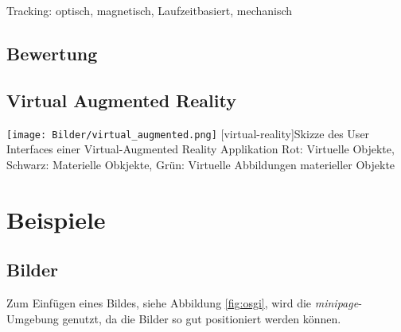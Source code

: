 \documentclass[12pt,a4paper,bibliography=totocnumbered,listof=totocnumbered]{scrartcl}
\begin{document}
Tracking: optisch, magnetisch, Laufzeitbasiert, mechanisch  
\subsection{Bewertung} 
\subsection{Virtual Augmented Reality}
\begin{minipage}{\linewidth}
\vspace{1em}
	\centering
	\texttt{[image: Bilder/virtual\_augmented.png]}
	[virtual-reality]{Skizze des User Interfaces einer Virtual-Augmented Reality Applikation\newline
	Rot: Virtuelle Objekte, Schwarz: Materielle Obkjekte, Grün: Virtuelle Abbildungen materieller Objekte}
	\label{fig:virtual_reality}
\vspace{1em}
\end{minipage}
\renewcommand\refname{Quellenverzeichnis}


\pagebreak

\section{Beispiele}


\subsection{Bilder}
Zum Einfügen eines Bildes, siehe Abbildung \ref{fig:osgi}, wird die \textit{minipage}-Umgebung genutzt, da die Bilder so gut positioniert werden können.
\end{document}
